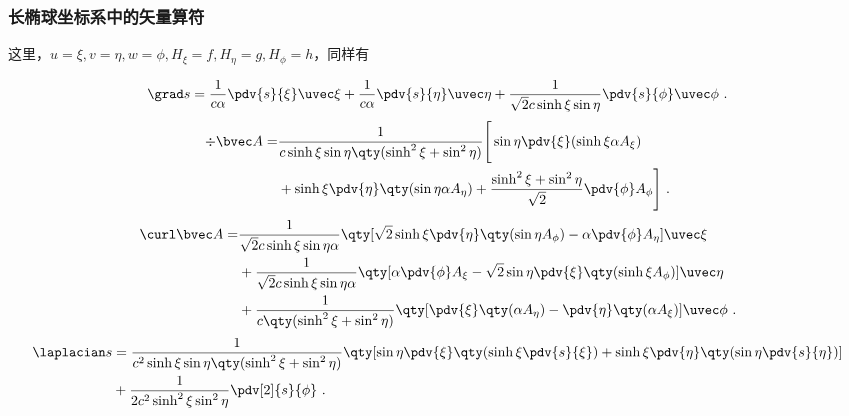 \subsubsection{长椭球坐标系中的矢量算符}
这里，$u=\xi,v=\eta,w=\phi,H_\xi=f,H_\eta=g,H_\phi=h$，同样有

\begin{equation}
\grad s = \frac{1}{c\alpha} \pdv{s}{\xi}\uvec \xi + \frac{1}{c\alpha}\pdv{s}{\eta} \uvec \eta +  \frac{1}{\sqrt{2}c\sinh\xi\sin\eta}\pdv{s}{\phi}\uvec \phi~.
\end{equation}
\begin{equation}
\begin{aligned}
\div \bvec A = &\frac{1}{c\sinh\xi\sin\eta\qty(\sinh^2\xi+\sin^2\eta)}\Bigg[\sin\eta\pdv{\xi}(\sinh\xi\alpha A_\xi) \\&+ \sinh\xi\pdv{\eta}\qty(\sin\eta\alpha A_\eta) + \frac{\sinh^2\xi+\sin^2\eta}{\sqrt{2}}\pdv{\phi}A_\phi\Bigg]~.
\end{aligned}
\end{equation}
\begin{equation}
\begin{aligned}
\curl \bvec A =& \frac{1}{\sqrt{2}c\sinh\xi\sin\eta\alpha}\qty[\sqrt{2}\sinh\xi\pdv{\eta}\qty(\sin\eta
A_\phi) - \alpha\pdv{\phi}A_\eta]\uvec \xi\\
&+ \frac{1}{\sqrt{2}c\sinh\xi\sin\eta\alpha}\qty[\alpha\pdv{\phi}A_\xi - \sqrt{2}\sin\eta\pdv{\xi}\qty(\sinh\xi
A_\phi)]\uvec \eta
\\
&+\frac{1}{c\qty(\sinh^2\xi+\sin^2\eta)}\qty[\pdv{\xi}\qty(\alpha A_\eta) - \pdv{\eta}\qty(\alpha A_\xi)]\uvec \phi~.
\end{aligned}
\end{equation}
\begin{equation}
\begin{aligned}
\laplacian s &= \frac{1}{c^2\sinh\xi\sin\eta\qty(\sinh^2\xi+\sin^2\eta)}\qty[\sin\eta\pdv{\xi}\qty(\sinh\xi\pdv{s}{\xi}) + \sinh\xi\pdv{\eta}\qty(\sin\eta\pdv{s}{\eta})]\\
& + \frac{1}{2c^2\sinh^2\xi\sin^2\eta }\pdv[2]{s}{\phi}~.
\end{aligned}
\end{equation}

